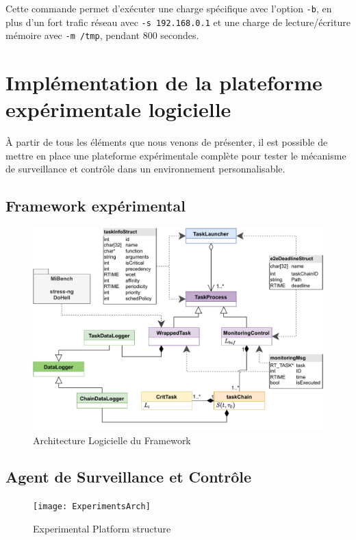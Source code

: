 \documentclass[french, a4paper, 11pt, twoside, pdftex]{StyleThese}
\begin{document}
	Cette commande permet d'exécuter une charge spécifique avec l'option \texttt{-b}, en plus d'un fort trafic réseau avec \texttt{-s 192.168.0.1} et une charge de lecture/écriture mémoire avec \texttt{-m /tmp}, pendant 800 secondes.
        
    \section{Implémentation de la plateforme expérimentale logicielle}
    
    À partir de tous les éléments que nous venons de présenter, il est possible de mettre en place une plateforme expérimentale complète pour tester le mécanisme de surveillance et contrôle dans un environnement personnalisable.
    	\subsection{Framework expérimental}
    
    \begin{figure}[h]
    	\centering
    	\includegraphics[width=\linewidth]{schemas/Implementation_DiagrammeDeClasse}
    	\caption{Architecture Logicielle du Framework}
    	\label{fig:implementationdiagrammedeclasse}
    \end{figure}
    
    
    	\subsection{Agent de Surveillance et Contrôle}
            \begin{figure}
                \centering
                \texttt{[image: ExperimentsArch]}
                \caption{Experimental Platform structure\label{fig:expe}}
            \end{figure}
    
\end{document}
